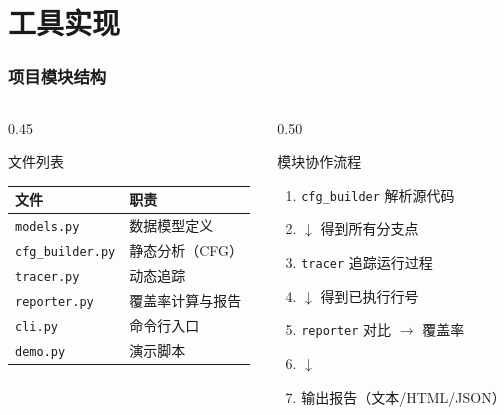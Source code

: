 \documentclass[presentation,aspectratio=169,fontset=none]{ctexbeamer}
\begin{document}

\section{工具实现}

\begin{frame}
\frametitle{项目模块结构}
\begin{columns}[T]
\begin{column}{0.45\textwidth}
\begin{block}{\footnotesize 文件列表}
{\footnotesize
\begin{tabular}{ll}
\toprule
\textbf{文件} & \textbf{职责} \\
\midrule
\texttt{models.py} & 数据模型定义 \\
\texttt{cfg\_builder.py} & 静态分析（CFG） \\
\texttt{tracer.py} & 动态追踪 \\
\texttt{reporter.py} & 覆盖率计算与报告 \\
\texttt{cli.py} & 命令行入口 \\
\texttt{demo.py} & 演示脚本 \\
\bottomrule
\end{tabular}}
\end{block}
\end{column}

\begin{column}{0.50\textwidth}
\begin{block}{\footnotesize 模块协作流程}
{\footnotesize
\centering
\begin{enumerate}
    \item \texttt{cfg\_builder} 解析源代码
    \item[] $\downarrow$ 得到所有分支点
    \item \texttt{tracer} 追踪运行过程
    \item[] $\downarrow$ 得到已执行行号
    \item \texttt{reporter} 对比 $\rightarrow$ 覆盖率
    \item[] $\downarrow$
    \item 输出报告（文本/HTML/JSON）
\end{enumerate}}
\end{block}
\end{column}
\end{columns}
\end{frame}
\end{document}
